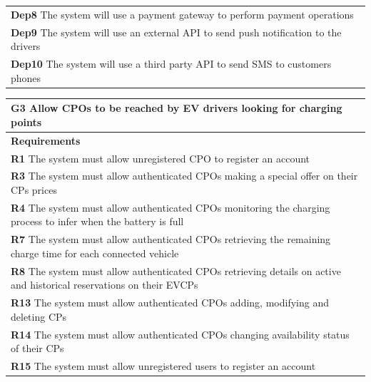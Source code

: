 \begin{table}[H]
\begin{tabularx}{\textwidth}{X}
        \textbf{Dep8}  The system will use a payment gateway to perform payment operations                                                                                           \\
        \textbf{Dep9}  The system will use an external API to send push notification to the drivers                                                                                  \\
        \textbf{Dep10} The system will use a third party API to send SMS to customers phones                                                                                         \\ \bottomrule
    \end{tabularx}
\end{table}
\begin{table}[H]
    \begin{tabularx}{\textwidth}{X}
        \toprule
        \textbf{G3} Allow CPOs to be reached by EV drivers looking for charging points                                                \\ \midrule
        \textbf{Requirements}                                                                                                         \\ \midrule
        \textbf{R1}  The system must allow unregistered CPO to register an account                                                    \\
        \textbf{R3}  The system must allow authenticated CPOs making a special offer on their CPs prices                              \\
        \textbf{R4}  The system must allow authenticated CPOs monitoring the charging process to infer when the battery is full       \\
        \textbf{R7}  The system must allow authenticated CPOs retrieving the remaining charge time for each connected vehicle         \\
        \textbf{R8}  The system must allow authenticated CPOs retrieving details on active and historical reservations on their EVCPs \\
        \textbf{R13} The system must allow authenticated CPOs adding, modifying and deleting CPs                                      \\
        \textbf{R14} The system must allow authenticated CPOs changing availability status of their CPs                               \\
        \textbf{R15} The system must allow unregistered users to register an account                                                  \\

\end{tabularx}
\end{table}
